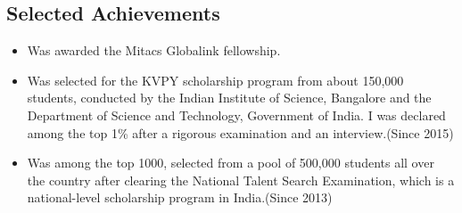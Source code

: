 \documentclass[margin, centered]{res}
\begin{document}
\begin{resume}
\section{\textbf{Selected Achievements}}
\begin{itemize}
\item Was awarded the Mitacs Globalink fellowship.
\item Was selected for the KVPY scholarship program from about 150,000 students, conducted by the Indian Institute of Science, Bangalore and the Department of Science and Technology, Government of India. I was declared among the top 1\% after a rigorous examination and an interview.(Since 2015)
\item Was among the top 1000, selected from a pool of 500,000 students all over the country after clearing the National Talent Search Examination, which is a national-level scholarship program in India.(Since 2013)
\end{itemize}


\end{resume}
\end{document}
